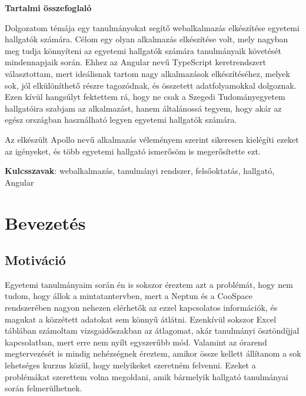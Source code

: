 \documentclass[a4paper,12pt]{report}
\begin{document}
\newpage
{\Huge \bf Tartalmi összefoglaló}

\vspace{2 cm}

Dolgozatom témája egy tanulmányokat segítő webalkalmazás elkészítése egyetemi hallgatók számára. Célom egy olyan alkalmazás elkészítése volt, mely nagyban meg tudja könnyíteni az egyetemi hallgatók számára tanulmányaik követését mindennapjaik során. Ehhez az Angular nevű TypeScript keretrendszert választottam, mert ideálisnak tartom nagy alkalmazások elkészítéséhez, melyek sok, jól elkülöníthető részre tagozódnak, és összetett adatfolyamokkal dolgoznak. Ezen kívül hangsúlyt fektettem rá, hogy ne csak a Szegedi Tudományegyetem hallgatóira szabjam az alkalmazást, hanem általánossá tegyem, hogy akár az egész országban használható legyen egyetemi hallgatók számára.

Az elkészült Apollo nevű alkalmazás véleményem szerint sikeresen kielégíti ezeket az igényeket, és több egyetemi hallgató ismerősöm is megerősítette ezt.

\vspace{1 cm}

\textbf{Kulcsszavak}: webalkalmazás, tanulmányi rendszer, felsőoktatás, hallgató, Angular


\newpage
\pagebreak

\tableofcontents
\pagebreak

\chapter{Bevezetés}

\section{Motiváció}

Egyetemi tanulmányaim során én is sokszor éreztem azt a problémát, hogy nem tudom, hogy állok a mintatantervben, mert a Neptun \cite{neptun} és a CooSpace \cite{coospace} rendszerében nagyon nehezen elérhetők az ezzel kapcsolatos információk, és magukat a közzétett adatokat sem könnyű átlátni. Ezenkívül sokszor Excel táblában számoltam vizsgaidőszakban az átlagomat, akár tanulmányi ösztöndíjjal kapcsolatban, mert erre nem nyílt egyszerűbb mód. Valamint az órarend megtervezését is mindig nehézségnek éreztem, amikor össze kellett állítanom a sok lehetséges kurzus közül, hogy melyikeket szeretném felvenni. Ezeket a problémákat szerettem volna megoldani, amik bármelyik hallgató tanulmányai során felmerülhetnek.
\end{document}
